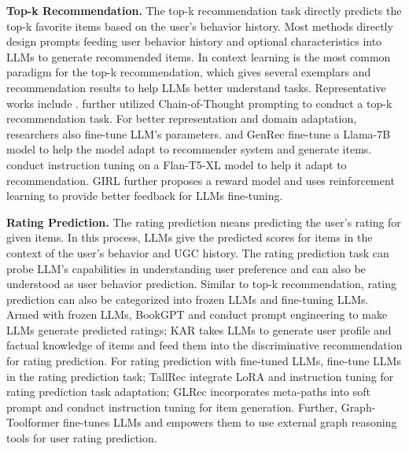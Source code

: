 \documentclass[11pt]{article}
\renewcommand\paragraph[1]{\vspace{0.05in} \noindent \textbf{#1.}}
\begin{document}
\paragraph{Top-k Recommendation}
The top-k recommendation task directly predicts the top-k favorite items based on the user's behavior history. Most methods directly design prompts feeding user behavior history and optional characteristics into LLMs to generate recommended items. In context learning is the most common paradigm for the top-k recommendation, which gives several exemplars and recommendation results to help LLMs better understand tasks. Representative works include \cite{liu2023chatgpt, dai2023uncovering, zhang2023chatgpt, liu2023genre, hou2023large, wang2023rethinking, du2023enhancing}. \citet{zhang2023recommendation} further utilized Chain-of-Thought prompting to conduct a top-k recommendation task. For better representation and domain adaptation, researchers also fine-tune LLM's parameters. \citet{chen2023palr} and GenRec \cite{ji2023genrec} fine-tune a Llama-7B model to help the model adapt to recommender system and generate items. \citet{zhang2023recommendation} conduct instruction tuning on a Flan-T5-XL model to help it adapt to recommendation. GIRL \cite{zheng2023generative} further proposes a reward model and uses reinforcement learning to provide better feedback for LLMs fine-tuning. 

\paragraph{Rating Prediction}
The rating prediction means predicting the user's rating for given items. In this process, LLMs give the predicted scores for items in the context of the user's behavior and UGC history. The rating prediction task can probe LLM's capabilities in understanding user preference and can also be understood as user behavior prediction. Similar to top-k recommendation, rating prediction can also be categorized into frozen LLMs and fine-tuning LLMs. Armed with frozen LLMs, BookGPT \cite{zhiyuli2023bookgpt} and  \citet{dai2023uncovering} conduct prompt engineering to make LLMs generate predicted ratings; KAR \cite{xi2023towards} takes LLMs to generate user profile and factual knowledge of items and feed them into the discriminative recommendation for rating prediction. For rating prediction with fine-tuned LLMs, \citet{kang2023llms} fine-tune LLMs in the rating prediction task; TallRec \cite{bao2023tallrec} integrate LoRA and instruction tuning for rating prediction task adaptation; GLRec \cite{wu2023exploring} incorporates meta-paths into soft prompt and conduct instruction tuning for item generation. Further, Graph-Toolformer \cite{zhang2023graph} fine-tunes LLMs and empowers them to use external graph reasoning tools for user rating prediction.
\end{document}
